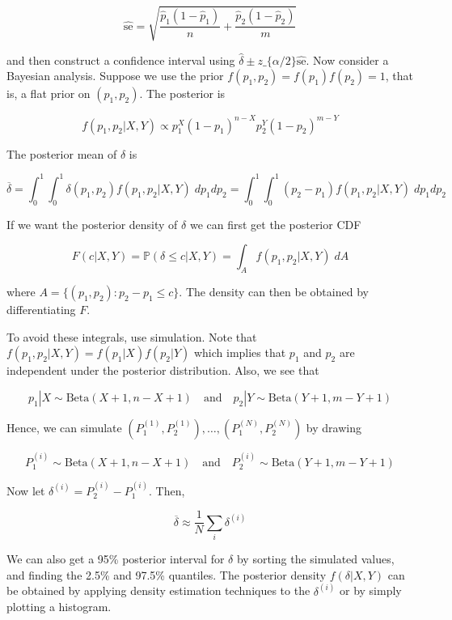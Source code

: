 \[ \hat{\text{se}} = \sqrt{\frac{\hat{p}_{1} (1 - \hat{p}_{1})}{n} + \frac{\hat{p}_{2} (1 - \hat{p}_{2})}{m}} \]

and then construct a confidence interval using $\hat{\delta}
\pm z\_\{\alpha / 2\} \hat{\text{se}} $. Now consider a Bayesian
analysis. Suppose we use the prior \(f(p_{1}, p_{2}) = f(p_{1}) f(p_{2}) = 1\),
that is, a flat prior on \((p_{1}, p_{2})\). The posterior is

\[ f(p_{1}, p_{2} | X, Y) \propto p_{1}^{X} (1 - p_{1})^{n - X} p_{2}^Y (1 - p_{2})^{m - Y}\]

The posterior mean of \(\delta\) is

\[ \overline{\delta} = \int_{0}^{1} \int_{0}^{1} \delta(p_{1}, p_{2}) f(p_{1}, p_{2} | X, Y) \; dp_{1} dp_{2} = \int_{0}^{1} \int_{0}^{1} (p_{2} - p_{1}) f(p_{1}, p_{2} | X, Y) \; dp_{1} dp_{2} \]

If we want the posterior density of \(\delta\) we can first get the
posterior CDF

\[ F(c | X, Y) = \mathbb{P}(\delta \leq c | X, Y) = \int_A f(p_{1}, p_{2} | X, Y) \; dA \]

where \(A = \{ (p_{1}, p_{2}) : p_{2} - p_{1} \leq c \}\). The density can then
be obtained by differentiating \(F\).

To avoid these integrals,  use simulation. Note that
\(f(p_{1}, p_{2} | X, Y) = f(p_{1} | X) f(p_{2} | Y)\) which implies that
\(p_{1}\) and \(p_{2}\) are independent under the posterior distribution.
Also, we see that

\[ 
p_{1} | X \sim \text{Beta}(X + 1, n - X + 1) 
\quad \text{and} \quad
p_{2} | Y \sim \text{Beta}(Y + 1, m - Y + 1) 
\]

Hence, we can simulate
\((P_{1}^{(1)}, P_{2}^{(1)}), \dots, (P_{1}^{(N)}, P_{2}^{(N)})\) by drawing

\[ 
P_{1}^{(i)} \sim \text{Beta}(X + 1, n - X + 1) 
\quad \text{and} \quad
P_{2}^{(i)} \sim \text{Beta}(Y + 1, m - Y + 1) 
\]

Now let \(\delta^{(i)} = P_{2}^{(i)} - P_{1}^{(i)}\). Then,

\[ \overline{\delta} \approx \frac{1}{N} \sum_{i} \delta^{(i)} \]

We can also get a 95\% posterior interval for \(\delta\) by sorting the
simulated values, and finding the 2.5\% and 97.5\% quantiles. The
posterior density \(f(\delta | X, Y)\) can be obtained by applying
density estimation techniques to the \(\delta^{(i)}\) or by simply
plotting a histogram.


